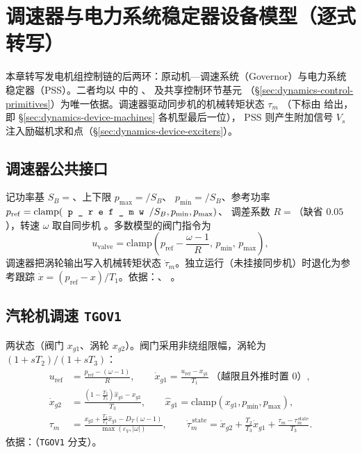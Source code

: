 \section{调速器与电力系统稳定器设备模型（逐式转写）}
\label{sec:dynamics-device-governors-pss}

本章转写发电机组控制链的后两环：原动机—调速系统（Governor）与电力系统稳定器（PSS）。二者均以
 中的 、
 及共享控制环节基元
（\S\ref{sec:dynamics-control-primitives}）为唯一依据。调速器驱动同步机的机械转矩状态 $\tau_m$
（下标由  给出，即 \S\ref{sec:dynamics-device-machines} 各机型最后一位），
PSS 则产生附加信号 $V_s$ 注入励磁机求和点（\S\ref{sec:dynamics-device-exciters}）。

\subsection{调速器公共接口}
\label{sec:dynamics-gov-common}
记功率基 $S_B=$、上下限 $p_{\max}=$$/S_B$、
$p_{\min}=$$/S_B$、参考功率 $p_{\mathrm{ref}}=\mathrm{clamp}(\text{\fld{p\_ref\_mw}}/S_B,p_{\min},p_{\max})$、
调差系数 $R=$（缺省 $0.05$），转速 $\omega$ 取自同步机 。多数模型的阀门指令为
\begin{equation}
 u_{\mathrm{valve}}=\mathrm{clamp}\!\left(p_{\mathrm{ref}}-\frac{\omega-1}{R},\,p_{\min},\,p_{\max}\right),
\end{equation}
调速器把涡轮输出写入机械转矩状态 $\dot\tau_m$。独立运行（未挂接同步机）时退化为参考跟踪
$\dot x=(p_{\mathrm{ref}}-x)/T_1$。依据：、
。

\subsection{汽轮机调速 \texttt{TGOV1}}
两状态（阀门 $x_{g1}$、涡轮 $x_{g2}$）。阀门采用非绕组限幅，涡轮为 $(1+sT_2)/(1+sT_3)$：
\begin{align}
 u_{\mathrm{ref}}&=\frac{p_{\mathrm{ref}}-(\omega-1)}{R},\qquad
 \dot x_{g1}=\frac{u_{\mathrm{ref}}-x_{g1}}{T_1}\ \text{（越限且外推时置 0）},\\
 \dot x_{g2}&=\frac{\left(1-\tfrac{T_2}{T_3}\right)\hat x_{g1}-x_{g2}}{T_3},\qquad
 \hat x_{g1}=\mathrm{clamp}(x_{g1},p_{\min},p_{\max}),\\
 \tau_m&=\frac{x_{g2}+\tfrac{T_2}{T_3}\hat x_{g1}-D_T(\omega-1)}{\max(\varepsilon_V,|\omega|)},\qquad
 \dot\tau_m^{\,\mathrm{state}}=\dot x_{g2}+\tfrac{T_2}{T_3}\dot x_{g1}+\frac{\tau_m-\tau_m^{\,\mathrm{state}}}{T_3}.
\end{align}
依据：（\texttt{TGOV1} 分支）。


